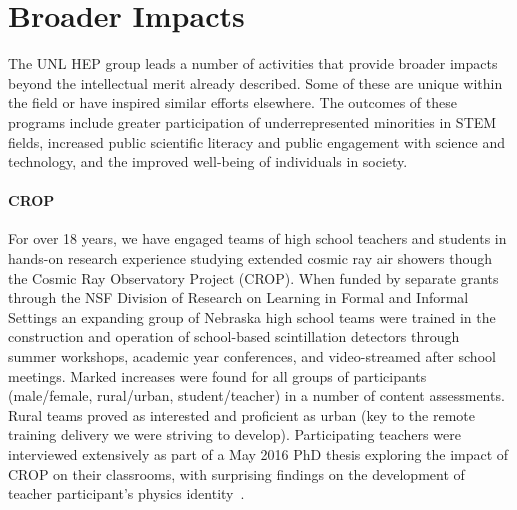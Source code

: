 \section{Broader Impacts}

The UNL HEP group leads a number of activities that provide broader impacts beyond the intellectual merit already described. Some of these are unique within the field or have inspired similar efforts elsewhere. The outcomes of these programs include  greater participation of underrepresented minorities in STEM fields, increased public scientific literacy and public engagement with science and technology, and the improved well-being of individuals in society.

\noindent

\paragraph{CROP}
For over 18 years, we have engaged teams of high school teachers and students in hands-on research experience studying extended cosmic ray air showers though the Cosmic Ray Observatory Project (CROP). When funded by separate grants through the NSF Division of Research on Learning in Formal and Informal Settings an expanding group of Nebraska high school teams were trained in the construction and operation of school-based scintillation detectors through summer workshops, academic year conferences, and video-streamed after school meetings. Marked increases were found for all groups of participants (male/female, rural/urban, student/teacher) in a number of content assessments. Rural teams proved as interested and proficient as urban (key to the remote training delivery we were striving to develop). Participating teachers were interviewed extensively as part of a May 2016 PhD thesis exploring the impact of CROP on their classrooms, with surprising findings on the development of teacher participant’s physics identity~\cite{bib:teacherdevelopment}.

